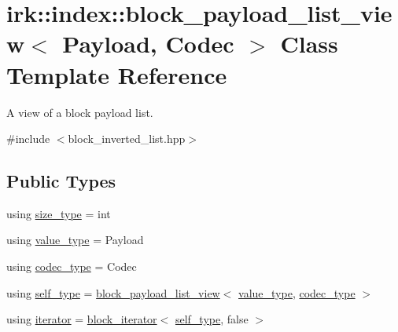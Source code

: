 \hypertarget{classirk_1_1index_1_1block__payload__list__view}{}\section{irk\+:\+:index\+:\+:block\+\_\+payload\+\_\+list\+\_\+view$<$ Payload, Codec $>$ Class Template Reference}
\label{classirk_1_1index_1_1block__payload__list__view}


A view of a block payload list.  




{\ttfamily \#include $<$block\+\_\+inverted\+\_\+list.\+hpp$>$}

\subsection*{Public Types}
\begin{DoxyCompactItemize}
\item 
using \mbox{\hyperlink{classirk_1_1index_1_1block__payload__list__view_a6b2a03ea0d351acce93c4e52b642b4db}{size\+\_\+type}} = int
\item 
using \mbox{\hyperlink{classirk_1_1index_1_1block__payload__list__view_aa7df004298a0dd0b1676007bbd43fe98}{value\+\_\+type}} = Payload
\item 
using \mbox{\hyperlink{classirk_1_1index_1_1block__payload__list__view_a2f176f6aaee1081eb5c64e5397dab6b2}{codec\+\_\+type}} = Codec
\item 
using \mbox{\hyperlink{classirk_1_1index_1_1block__payload__list__view_ad73e053770215907333add2295707aec}{self\+\_\+type}} = \mbox{\hyperlink{classirk_1_1index_1_1block__payload__list__view}{block\+\_\+payload\+\_\+list\+\_\+view}}$<$ \mbox{\hyperlink{classirk_1_1index_1_1block__payload__list__view_aa7df004298a0dd0b1676007bbd43fe98}{value\+\_\+type}}, \mbox{\hyperlink{classirk_1_1index_1_1block__payload__list__view_a2f176f6aaee1081eb5c64e5397dab6b2}{codec\+\_\+type}} $>$
\item 
using \mbox{\hyperlink{classirk_1_1index_1_1block__payload__list__view_a201e879cc73a3fd9476a2e1043f4d74d}{iterator}} = \mbox{\hyperlink{classirk_1_1index_1_1block__iterator}{block\+\_\+iterator}}$<$ \mbox{\hyperlink{classirk_1_1index_1_1block__payload__list__view_ad73e053770215907333add2295707aec}{self\+\_\+type}}, false $>$
\end{DoxyCompactItemize}
